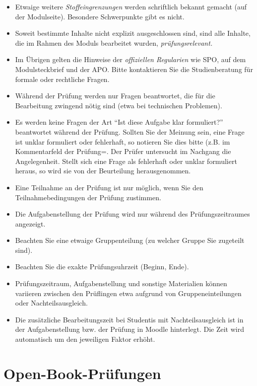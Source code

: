 \documentclass[
  a4paper,
  DIV=11]{scrreprt}
\providecommand{\tightlist}{%
  \setlength{\itemsep}{0pt}\setlength{\parskip}{0pt}}\usepackage{longtable,booktabs,array}
\theoremstyle{definition}
\theoremstyle{remark}
\begin{document}
\begin{itemize}
\tightlist
\item
  Etwaige weitere \emph{Stoffeingrenzungen} werden schriftlich bekannt
  gemacht (auf der Modulseite). Besondere Schwerpunkte gibt es nicht.
\item
  Soweit bestimmte Inhalte nicht explizit ausgeschlossen sind, sind alle
  Inhalte, die im Rahmen des Moduls bearbeitet wurden,
  \emph{prüfungsrelevant.}
\item
  Im Übrigen gelten die Hinweise der \emph{offiziellen Regularien} wie
  SPO, auf dem Modulsteckbrief und der APO. Bitte kontaktieren Sie die
  Studienberatung für formale oder rechtliche Fragen.
\item
  Während der Prüfung werden nur Fragen beantwortet, die für die
  Bearbeitung zwingend nötig sind (etwa bei technischen Problemen).
\item
  Es werden keine Fragen der Art ``Ist diese Aufgabe klar formuliert?''
  beantwortet während der Prüfung. Sollten Sie der Meinung sein, eine
  Frage ist unklar formuliert oder fehlerhaft, so notieren Sie dies
  bitte (z.B. im Kommentarfeld der Prüfung=. Der Prüfer untersucht im
  Nachgang die Angelegenheit. Stellt sich eine Frage als fehlerhaft oder
  unklar formuliert heraus, so wird sie von der Beurteilung
  herausgenommen.
\item
  Eine Teilnahme an der Prüfung ist nur möglich, wenn Sie den
  Teilnahmebedingungen der Prüfung zustimmen.
\item
  Die Aufgabenstellung der Prüfung wird nur während des
  Prüfungszeitraumes angezeigt.
\item
  Beachten Sie eine etwaige Gruppenteilung (zu welcher Gruppe Sie
  zugeteilt sind).
\item
  Beachten Sie die exakte Prüfungsuhrzeit (Beginn, Ende).
\item
  Prüfungszeitraum, Aufgabenstellung und sonstige Materialien können
  variieren zwischen den Prüflingen etwa aufgrund von
  Gruppeneinteilungen oder Nachteilsausgleich.
\item
  Die zusätzliche Bearbeitungszeit bei Studentis mit Nachteilsausgleich
  ist in der Aufgabenstellung bzw. der Prüfung in Moodle hinterlegt. Die
  Zeit wird automatisch um den jeweiligen Faktor erhöht.
\end{itemize}

\hypertarget{open-book-pruxfcfungen}{%
\section{Open-Book-Prüfungen}\label{open-book-pruxfcfungen}}
\end{document}
